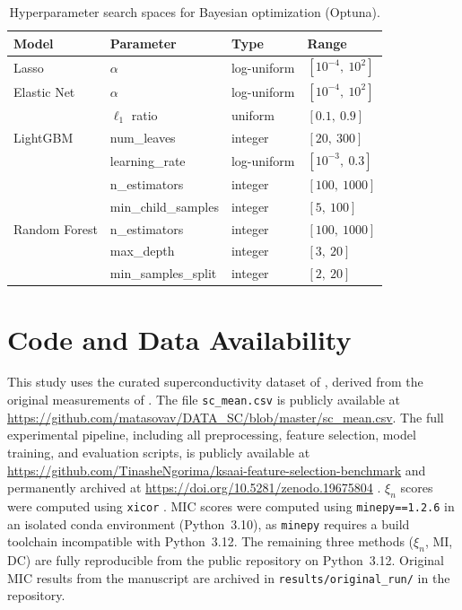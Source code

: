 \documentclass[twoside,11pt]{article}
\begin{document}
\begin{table}[t]
\centering
\caption{Hyperparameter search spaces for Bayesian optimization (Optuna).}
\label{tab:hyperparams}
\begin{tabular}{llll}
\toprule
Model & Parameter & Type & Range \\
\midrule
Lasso         & $\alpha$              & log-uniform & $[10^{-4},\ 10^{2}]$ \\
Elastic Net   & $\alpha$              & log-uniform & $[10^{-4},\ 10^{2}]$ \\
              & $\ell_1$ ratio        & uniform     & $[0.1,\ 0.9]$ \\
LightGBM      & num\_leaves           & integer     & $[20,\ 300]$ \\
              & learning\_rate        & log-uniform & $[10^{-3},\ 0.3]$ \\
              & n\_estimators         & integer     & $[100,\ 1000]$ \\
              & min\_child\_samples   & integer     & $[5,\ 100]$ \\
Random Forest & n\_estimators         & integer     & $[100,\ 1000]$ \\
              & max\_depth            & integer     & $[3,\ 20]$ \\
              & min\_samples\_split   & integer     & $[2,\ 20]$ \\
\bottomrule
\end{tabular}
\end{table}

\section{Code and Data Availability}
\label{app:data}
This study uses the curated superconductivity dataset of \citet{Matasov2020vis},
derived from the original measurements of \citet{Hamidieh2018data}. The file
\texttt{sc\_mean.csv} is publicly available at
\url{https://github.com/matasovav/DATA_SC/blob/master/sc_mean.csv}.
The full experimental pipeline, including all preprocessing, feature selection,
model training, and evaluation scripts, is publicly available at
\url{https://github.com/TinasheNgorima/ksaai-feature-selection-benchmark}
and permanently archived at \url{https://doi.org/10.5281/zenodo.19675804}
\citep{ngorima2026ksaai}.
$\xi_n$ scores were computed using \texttt{xicor} \citep{xicor2021}. MIC
scores were computed using \texttt{minepy==1.2.6} \citep{Albanese2013minepy}
in an isolated conda environment (Python~3.10), as \texttt{minepy} requires a
build toolchain incompatible with Python~3.12. The remaining three methods
($\xi_n$, MI, DC) are fully reproducible from the public repository on
Python~3.12. Original MIC results from the manuscript are archived in
\texttt{results/original\_run/} in the repository.

\vskip 0.2in

\end{document}
